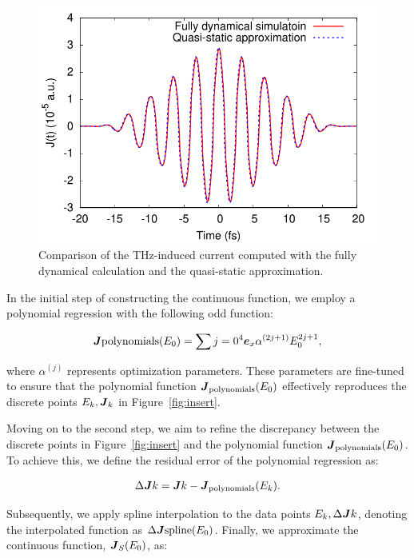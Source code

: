 \begin{figure}[htb]
    \centering
\includegraphics[width=0.8\linewidth]{pic/current_comparison_appendix.pdf}
\caption{\label{fig:current} Comparison of the THz-induced current computed with the fully dynamical calculation and the quasi-static approximation.}
\end{figure}

In the initial step of constructing the continuous function, we employ a polynomial regression with the following odd function:

\begin{align}
\boldsymbol{J}{\mathrm{polynomials }}(E_0)= \sum\limits{j=0}^{4} \boldsymbol e_x \alpha^{(2j+1)} E^{2j+1}_0,
\label{eq:appendix-polynomial}
\end{align}

where $\alpha^{(j)}$ represents optimization parameters. These parameters are fine-tuned to ensure that the polynomial function $\boldsymbol{J}_{\mathrm{polynomials }}(E_0)$ effectively reproduces the discrete points ${E_k, \boldsymbol J_k}$ in Figure~\ref{fig:insert}.

Moving on to the second step, we aim to refine the discrepancy between the discrete points in Figure~\ref{fig:insert} and the polynomial function $\boldsymbol{J}_{\mathrm{polynomials }}(E_0)$. To achieve this, we define the residual error of the polynomial regression as:

\begin{align}
\Delta \boldsymbol{J}k=\boldsymbol{J}{k}-\boldsymbol{J}_{\mathrm{polynomials}}(E_k).
\end{align}

Subsequently, we apply spline interpolation to the data points ${E_k, \Delta \boldsymbol{J}k}$, denoting the interpolated function as $\Delta \boldsymbol{J}{\mathrm{spline}}(E_0)$. Finally, we approximate the continuous function, $\boldsymbol J_S(E_0)$, as:

